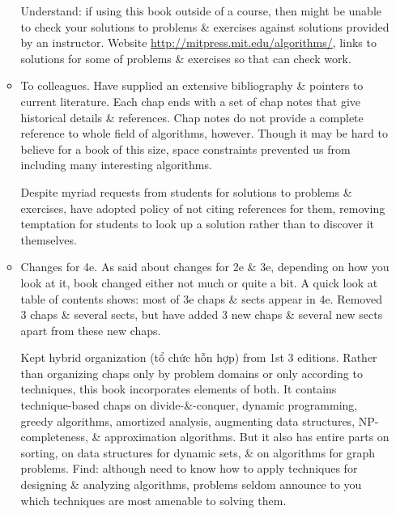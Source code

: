 \documentclass{article}
\begin{document}
\begin{itemize}
\begin{itemize}
		Understand: if using this book outside of a course, then might be unable to check your solutions to problems \& exercises against solutions provided by an instructor. Website \url{http://mitpress.mit.edu/algorithms/}, links to solutions for some of problems \& exercises so that can check work.
		\item {\sf To colleagues.} Have supplied an extensive bibliography \& pointers to current literature. Each chap ends with a set of chap notes that give historical details \& references. Chap notes do not provide a complete reference to whole field of algorithms, however. Though it may be hard to believe for a book of this size, space constraints prevented us from including many interesting algorithms.
		
		Despite myriad requests from students for solutions to problems \& exercises, have adopted policy of not citing references for them, removing temptation for students to look up a solution rather than to discover it themselves.
		\item {\sf Changes for 4e.} As said about changes for 2e \& 3e, depending on how you look at it, book changed either not much or quite a bit. A quick look at table of contents shows: most of 3e chaps \& sects appear in 4e. Removed 3 chaps \& several sects, but have added 3 new chaps \& several new sects apart from these new chaps.
		
		Kept hybrid organization (tổ chức hỗn hợp) from 1st 3 editions. Rather than organizing chaps only by problem domains or only according to techniques, this book incorporates elements of both. It contains technique-based chaps on divide-\&-conquer, dynamic programming, greedy algorithms, amortized analysis, augmenting data structures, NP-completeness, \& approximation algorithms. But it also has entire parts on sorting, on data structures for dynamic sets, \& on algorithms for graph problems. Find: although need to know how to apply techniques for designing \& analyzing algorithms, problems seldom announce to you which techniques are most amenable to solving them.
		

\end{itemize}
\end{itemize}
\end{document}
